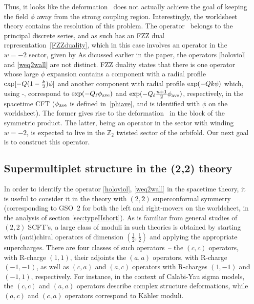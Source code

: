 \documentclass[12pt]{article}
\def\sl{\text{sl}}
\def\half{\frac12}
\newcommand{\bZ}{{\mathbb Z}}
\numberwithin{equation}{section}
\def\half{\frac12}
\def\exp{{\rm exp}}
\begin{document}
Thus, it looks like the deformation \Lblock\ does not actually achieve the goal of keeping the field $\phi$ away from the strong coupling region. Interestingly, the worldsheet theory contains the resolution of this problem. The operator \holoviol\ belongs to the principal discrete series, and as such has an FZZ dual representation~\eqref{FZZduality}, which in this case involves an operator in the $w=-2$ sector, given by
\eqn[weq2wall]{
e^{-\varphi-\bar\varphi}\,
e^{i(H_\sl+\bar H_\sl)}\, 
(\partial\varphi+i\partial H_\sl) 
(\bar\partial\varphi+i\bar\partial \bar{H}_\sl)\,
\Phi^{(-2)}_{k;k,k}  ~.
}
As dicussed earlier in the paper, the operators \eqref{holoviol} and \eqref{weq2wall} are not distinct. FZZ duality states that there is one operator whose large $\phi$ expansion contains a component with a radial profile $\exp[-Q(1-\frac k2)\phi]$ and another component with radial profile $\exp(-Qk\phi)$ which, using \Qtilde-\jSTjWS, correspond to $\exp(-Q_\ell\phi_{\rm ave})$ and $\exp(-Q_\ell\frac{n+1}2\phi_{\rm ave})$, respectively, in the spacetime CFT ($\phi_{\rm ave}$ is defined in~\eqref{phiave}, and is identified with $\phi$ on the worldsheet). The former gives rise to the deformation \Lblock\ in the block of the symmetric product. The latter, being an operator in the sector with winding $w=-2$, is expected to live in the $\bZ_2$ twisted sector of the orbifold. Our next goal is to construct this operator. 

\subsection{Supermultiplet structure in the (2,2) theory}
\label{sec:susystruc}

In order to identify the operator \eqref{holoviol}, \eqref{weq2wall} in the spacetime theory, it is useful to consider it in the theory with $(2,2)$ superconformal symmetry (corresponding to GSO~2 for both the left and right-movers on the worldsheet, in the analysis of section \ref{sec:typeIIshort}). As is familiar from general studies of $(2,2)$ SCFT's, a large class of moduli in such theories is obtained by starting with (anti)chiral operators of dimension $\left(\half,\half\right)$ and applying the appropriate supercharges. There are four classes of such operators~-- the $(c,c)$ operators, with R-charge $(1,1)$, their adjoints the $(a,a)$ operators, with R-charge $(-1,-1)$, as well as $(c,a)$ and $(a,c)$ operators with R-charges $(1,-1)$ and $(-1,1)$, respectively.  For instance, in the context of Calabi-Yau sigma models, the $(c,c)$ and $(a,a)$ operators describe complex structure deformations, while $(a,c)$ and $(c,a)$ operators correspond to K\"ahler moduli. 
\end{document}
